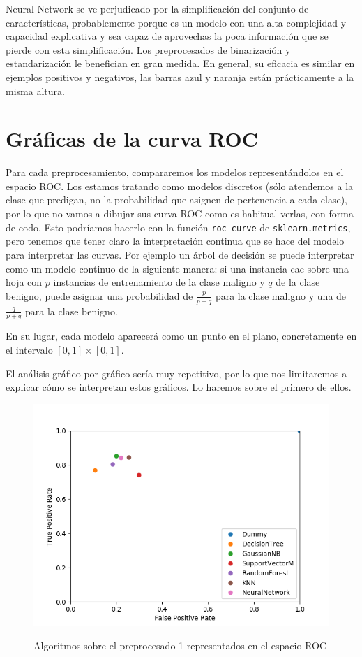\documentclass[oneside]{book}
\begin{document}
Neural Network se ve perjudicado por la simplificación del conjunto de
características, probablemente porque es un modelo con una alta
complejidad y capacidad explicativa y sea capaz de aprovechas la poca
información que se pierde con esta simplificación. Los preprocesados
de binarización y estandarización le benefician en gran medida. En
general, su eficacia es similar en ejemplos positivos y negativos, las barras azul y naranja están prácticamente a la misma altura.

\section{Gráficas de la curva ROC}

Para cada preprocesamiento, compararemos los modelos representándolos
en el espacio ROC. Los estamos tratando como modelos discretos (sólo
atendemos a la clase que predigan, no la probabilidad que asignen de
pertenencia a cada clase), por lo que no vamos a dibujar sus curva ROC
como es habitual verlas, con forma de codo. Esto podríamos hacerlo con
la función \texttt{roc\_curve} de \texttt{sklearn.metrics}, pero
tenemos que tener claro la interpretación continua que se hace del
modelo para interpretar las curvas. Por ejemplo un árbol de decisión
se puede interpretar como un modelo continuo de la siguiente manera:
si una instancia cae sobre una hoja con $p$ instancias de
entrenamiento de la clase maligno y $q$ de la clase benigno, puede
asignar una probabilidad de $\frac{p}{p+q}$ para la clase maligno y
una de $\frac{q}{p+q}$ para la clase benigno.

En su lugar, cada modelo aparecerá como un punto en el plano,
concretamente en el intervalo $[0,1]\times[0,1]$.

El análisis gráfico por gráfico sería muy repetitivo, por lo que nos
limitaremos a explicar cómo se interpretan estos gráficos. Lo haremos
sobre el primero de ellos.

\begin{figure}[H]
  \centering
  \caption{Algoritmos sobre el preprocesado 1 representados en el espacio ROC}
  \includegraphics[width=120mm]{figures/visualizacion/roc1}
  \label{fig:roc1}
\end{figure}
\end{document}
